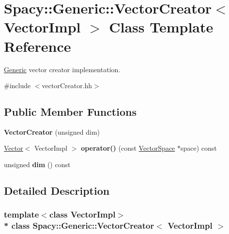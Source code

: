 \hypertarget{classSpacy_1_1Generic_1_1VectorCreator}{}\section{Spacy\+:\+:Generic\+:\+:Vector\+Creator$<$ Vector\+Impl $>$ Class Template Reference}
\label{classSpacy_1_1Generic_1_1VectorCreator}


\hyperlink{namespaceSpacy_1_1Generic}{Generic} vector creator implementation.  




{\ttfamily \#include $<$vector\+Creator.\+hh$>$}

\subsection*{Public Member Functions}
\begin{DoxyCompactItemize}
\item 
{\bfseries Vector\+Creator} (unsigned dim)\hypertarget{classSpacy_1_1Generic_1_1VectorCreator_a19fcd1bd6edb602294cf1c1eedc64c55}{}\label{classSpacy_1_1Generic_1_1VectorCreator_a19fcd1bd6edb602294cf1c1eedc64c55}

\item 
\hyperlink{classSpacy_1_1Generic_1_1Vector}{Vector}$<$ Vector\+Impl $>$ {\bfseries operator()} (const \hyperlink{classSpacy_1_1VectorSpace}{Vector\+Space} $\ast$space) const \hypertarget{classSpacy_1_1Generic_1_1VectorCreator_ad394c7a64f4270c89e13af1f75649ad9}{}\label{classSpacy_1_1Generic_1_1VectorCreator_ad394c7a64f4270c89e13af1f75649ad9}

\item 
unsigned {\bfseries dim} () const \hypertarget{classSpacy_1_1Generic_1_1VectorCreator_a1f1e7616f7319b511655873eed442088}{}\label{classSpacy_1_1Generic_1_1VectorCreator_a1f1e7616f7319b511655873eed442088}

\end{DoxyCompactItemize}


\subsection{Detailed Description}
\subsubsection*{template$<$class Vector\+Impl$>$\\*
class Spacy\+::\+Generic\+::\+Vector\+Creator$<$ Vector\+Impl $>$}

